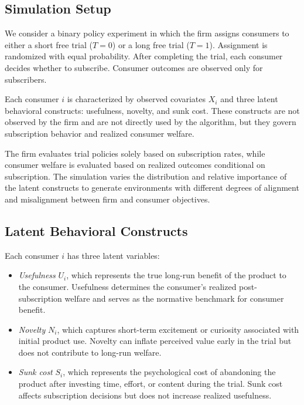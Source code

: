 \documentclass[11pt,letterpaper,english]{article}
\theoremstyle{definition}
\theoremstyle{definition}
\begin{document}
\begin{bibunit}
\subsection{Simulation Setup}
\label{sec:simulation2-setup}

We consider a binary policy experiment in which the firm assigns consumers to either a short free trial ($T=0$) or a long free trial ($T=1$). Assignment is randomized with equal probability. After completing the trial, each consumer decides whether to subscribe. Consumer outcomes are observed only for subscribers.

Each consumer $i$ is characterized by observed covariates $X_i$ and three latent behavioral constructs: usefulness, novelty, and sunk cost. These constructs are not observed by the firm and are not directly used by the algorithm, but they govern subscription behavior and realized consumer welfare.

The firm evaluates trial policies solely based on subscription rates, while consumer welfare is evaluated based on realized outcomes conditional on subscription. The simulation varies the distribution and relative importance of the latent constructs to generate environments with different degrees of alignment and misalignment between firm and consumer objectives.

\subsection{Latent Behavioral Constructs}
\label{sec:simulation2-latent}

Each consumer $i$ has three latent variables:

\begin{itemize}
    \item \emph{Usefulness} $U_i$, which represents the true long-run benefit of the product to the consumer. Usefulness determines the consumer’s realized post-subscription welfare and serves as the normative benchmark for consumer benefit.
    \item \emph{Novelty} $N_i$, which captures short-term excitement or curiosity associated with initial product use. Novelty can inflate perceived value early in the trial but does not contribute to long-run welfare.
    \item \emph{Sunk cost} $S_i$, which represents the psychological cost of abandoning the product after investing time, effort, or content during the trial. Sunk cost affects subscription decisions but does not increase realized usefulness.
\end{itemize}


\end{bibunit}
\end{document}
